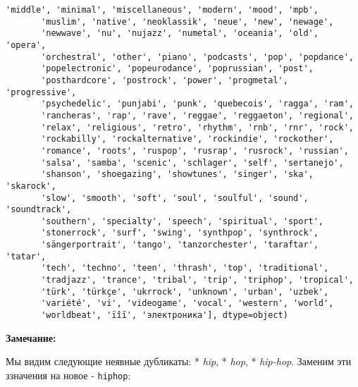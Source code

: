 \documentclass[11pt]{article}
\begin{document}
\begin{tcolorbox}[breakable, size=fbox, boxrule=.5pt, pad at break*=1mm, opacityfill=0]
\begin{Verbatim}[commandchars=\\\{\}]
       'middle', 'minimal', 'miscellaneous', 'modern', 'mood', 'mpb',
       'muslim', 'native', 'neoklassik', 'neue', 'new', 'newage',
       'newwave', 'nu', 'nujazz', 'numetal', 'oceania', 'old', 'opera',
       'orchestral', 'other', 'piano', 'podcasts', 'pop', 'popdance',
       'popelectronic', 'popeurodance', 'poprussian', 'post',
       'posthardcore', 'postrock', 'power', 'progmetal', 'progressive',
       'psychedelic', 'punjabi', 'punk', 'quebecois', 'ragga', 'ram',
       'rancheras', 'rap', 'rave', 'reggae', 'reggaeton', 'regional',
       'relax', 'religious', 'retro', 'rhythm', 'rnb', 'rnr', 'rock',
       'rockabilly', 'rockalternative', 'rockindie', 'rockother',
       'romance', 'roots', 'ruspop', 'rusrap', 'rusrock', 'russian',
       'salsa', 'samba', 'scenic', 'schlager', 'self', 'sertanejo',
       'shanson', 'shoegazing', 'showtunes', 'singer', 'ska', 'skarock',
       'slow', 'smooth', 'soft', 'soul', 'soulful', 'sound', 'soundtrack',
       'southern', 'specialty', 'speech', 'spiritual', 'sport',
       'stonerrock', 'surf', 'swing', 'synthpop', 'synthrock',
       'sängerportrait', 'tango', 'tanzorchester', 'taraftar', 'tatar',
       'tech', 'techno', 'teen', 'thrash', 'top', 'traditional',
       'tradjazz', 'trance', 'tribal', 'trip', 'triphop', 'tropical',
       'türk', 'türkçe', 'ukrrock', 'unknown', 'urban', 'uzbek',
       'variété', 'vi', 'videogame', 'vocal', 'western', 'world',
       'worldbeat', 'ïîï', 'электроника'], dtype=object)
\end{Verbatim}
\end{tcolorbox}
        
    \textbf{Замечание:}

Мы видим следующие неявные дубликаты: * \emph{hip}, * \emph{hop}, *
\emph{hip-hop}. Заменим эти ззначения на новое - \texttt{hiphop}:
\end{document}
